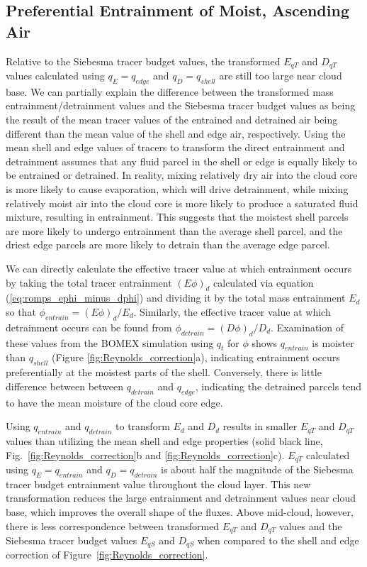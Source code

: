\documentclass[12pt]{article}
\begin{document}

\subsection{Preferential Entrainment of Moist, Ascending Air}

Relative to the Siebesma tracer budget values, the transformed $E_{q T}$ and 
$D_{q T}$ values calculated using $q_E = q_{edge}$ and $q_D = q_{shell}$ are 
still too large near cloud base. We can partially explain the difference 
between the transformed mass entrainment/detrainment values and the Siebesma 
tracer budget values as being the result of the mean tracer values 
of the entrained and detrained air being different than the mean value of the 
shell and edge air, respectively.  Using the mean shell and edge values of 
tracers to transform the direct entrainment and detrainment assumes that any 
fluid parcel in the shell or edge is equally likely to be entrained or 
detrained.  In reality, mixing relatively dry air into the cloud core is more 
likely to cause evaporation, which will drive detrainment, while mixing 
relatively moist air into the cloud core is more likely to produce a saturated 
fluid mixture, resulting in entrainment.  This suggests that the moistest 
shell parcels are more likely to undergo entrainment than the average shell 
parcel, and the driest edge parcels are more likely to detrain than the 
average edge parcel.

We can directly calculate the effective tracer value at which entrainment 
occurs by taking the total tracer entrainment $(E\phi)_d$ calculated via 
equation (\ref{eq:romps_ephi_minus_dphi}) and dividing it by the total mass
entrainment $E_d$ so that $\phi_{entrain} = (E\phi)_d / E_d$.  Similarly, 
the effective tracer value at which detrainment occurs can be found from  
$\phi_{detrain} = (D\phi)_d / D_d$.  Examination of these values from the 
BOMEX simulation using $q_t$ for $\phi$ shows $q_{entrain}$ is moister than 
$q_{shell}$ (Figure \ref{fig:Reynolds_correction}a), indicating entrainment
occurs preferentially at the moistest parts of the shell.  Conversely, 
there is little difference between between $q_{detrain}$ and $q_{edge}$,
indicating the detrained parcels tend to have the mean moisture of the cloud 
core edge.

Using $q_{entrain}$ and $q_{detrain}$ to transform $E_d$ and $D_d$
results in smaller $E_{q T}$ and $D_{q T}$ values than utilizing the
mean shell and edge properties (solid black line,
Fig.~\ref{fig:Reynolds_correction}b and
\ref{fig:Reynolds_correction}c).  $E_{q T}$ calculated using $q_E =
q_{entrain}$ and $q_D = q_{detrain}$ is about half the magnitude of
the Siebesma tracer budget entrainment value throughout the cloud
layer.  This new transformation reduces the large entrainment and
detrainment values near cloud base, which improves the overall shape
of the fluxes. Above mid-cloud, however, there is less correspondence 
between transformed $E_{q T}$ and $D_{q T}$ values and the Siebesma
tracer budget values $E_{q S}$ and $D_{q S}$ when compared to the 
shell and edge correction of Figure~\ref{fig:Reynolds_correction}.
\end{document}
